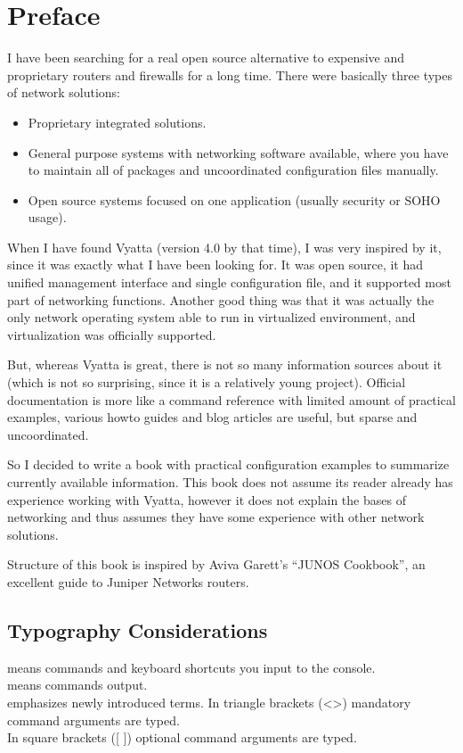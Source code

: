 \chapter*{Preface}
I have been searching for a real open source alternative to expensive and proprietary routers and firewalls for a long time. There were basically three types of network solutions:
\begin{itemize}
 \item Proprietary integrated solutions.
 \item General purpose systems with networking software available, where you have to maintain all of packages and
 uncoordinated configuration files manually.
 \item Open source systems focused on one application (usually security or SOHO usage).
\end{itemize}
When I have found Vyatta (version 4.0 by that time), I was very inspired by it, since it was exactly what I have been
looking for. It was open source, it had unified management interface and single configuration file, and it supported 
most part of networking functions. Another good thing was that it was actually the only network operating system able to run in virtualized environment, and virtualization was officially supported.

But, whereas Vyatta is great, there is not so many information sources about it (which is not so surprising, since it is a relatively young project). Official documentation is more like a command reference with limited amount of practical examples, various howto guides and blog articles are useful, but sparse and uncoordinated.

So I decided to write a book with practical configuration examples to summarize currently available information. This book does not assume its reader already has experience working with Vyatta, however it does not explain the bases of networking and thus assumes they have some experience with other network solutions.

Structure of this book is inspired by Aviva Garett's ``JUNOS Cookbook'', an excellent guide to Juniper Networks routers.

\section*{Typography Considerations}
 means commands and keyboard shortcuts you input to the console. \\
 means commands output. \\
 emphasizes newly introduced terms.
In triangle brackets (\textless \textgreater) mandatory command arguments are typed. \\
In square brackets ([ ]) optional command arguments are typed. 

